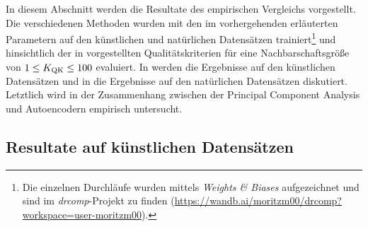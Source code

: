 In diesem Abschnitt werden die Resultate des empirischen Vergleichs vorgestellt. Die verschiedenen
Methoden wurden mit den im vorhergehenden 
erläuterten Parametern auf den künstlichen und natürlichen Datensätzen trainiert\footnote{Die
	einzelnen Durchläufe wurden mittels \textit{Weights \& Biases} aufgezeichnet und sind im
	\textit{drcomp}-Projekt zu finden
	(\url{https://wandb.ai/moritzm00/drcomp?workspace=user-moritzm00}).} und hinsichtlich der in
 vorgestellten Qualitätskriterien für
eine Nachbarschaftsgröße von $1 \leq K_{\text{QK}} \leq 100$ evaluiert. In
 werden die Ergebnisse auf den künstlichen
Datensätzen und in  die Ergebnisse auf den
natürlichen Datensätzen diskutiert. Letztlich wird in 
der Zusammenhang zwischen der Principal Component Analysis und Autoencodern empirisch untersucht.

\subsection{Resultate auf künstlichen Datensätzen}
\label{ch:Vergleich:sec:Resultate:kuenstlich}

